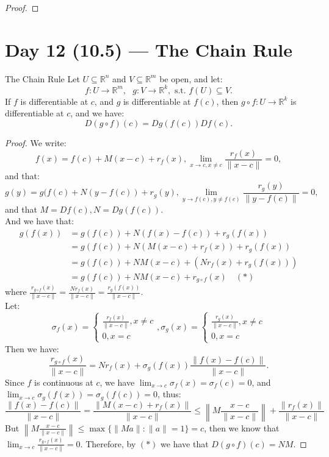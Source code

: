 \documentclass[11pt]{article}
\newenvironment{theorem}[1]{\begin{thmbox}{#1}{}}{\end{thmbox}}
\theoremstyle{quiet}
\theoremstyle{quietremark}
\begin{document}
\begin{proof}

\end{proof}


\newpage
\section{Day 12 (10.5) --- The Chain Rule}
\begin{theorem}{The Chain Rule}
Let $U\subseteq\mathbb{R}^n$ and $V\subseteq\mathbb{R}^m$ be open, and let:
\[
f:U\to\mathbb{R}^m, \text{ }g:V\to\mathbb{R}^k, \text{ s.t. } f(U)\subseteq V.
\]
If $f$ is differentiable at $c$, and $g$ is differentiable at $f(c)$, then $g\circ f:U\to\mathbb{R}^k$ is differentiable at $c$, and we have:
\[
D(g\circ f)(c)=Dg(f(c))Df(c).
\]
\end{theorem}

\begin{proof}
We write:
\[
f(x)=f(c)+M(x-c)+r_f(x), \lim_{x\to c,x\ne c}\frac{r_f(x)}{\|x-c\|}=0,
\]
and that:
\[
g(y)=g(f(c)+N(y-f(c))+r_g(y), \lim_{y\to f(c),y\ne f(c)}\frac{r_g(y)}{\|y-f(c)\|}=0, 
\]
and that $M=Df(c), N=Dg(f(c))$.\\
And we have that:
\[
\begin{aligned}
g(f(x)) &= g(f(c)) + N(f(x)-f(c)) + r_g(f(x)) \\
&= g(f(c)) + N(M(x-c)+r_f(x)) + r_g(f(x)) \\
&= g(f(c)) + NM(x-c) + (Nr_f(x)+r_g(f(x))) \\
&= g(f(c)) + NM(x-c) + r_{g\circ f}(x) \quad (*)
\end{aligned}
\]
where $\displaystyle\frac{r_{g\circ f}(x)}{\|x-c\|}=\frac{Nr_f(x)}{\|x-c\|}=\frac{r_g(f(x))}{\|x-c\|}$.
\\Let:
\[
\sigma_f(x)=\begin{cases}\frac{r_f(x)}{\|x-c\|},x\ne c\\0,x=c\end{cases}, \sigma_g(x)=\begin{cases}\frac{r_g(x)}{\|x-c\|},x\ne c\\0,x=c\end{cases}
\]
Then we have:
\[
\frac{r_{g\circ f}(x)}{\|x-c\|}=Nr_f(x)+\sigma_g(f(x))\frac{\|f(x)-f(c)\|}{\|x-c\|}.
\]
Since $f$ is continuous at $c$, we have $\displaystyle\lim_{x\to c}\sigma_f(x)=\sigma_f(c)=0$, and $\displaystyle\lim_{x\to c}\sigma_g(f(x))=\sigma_g(f(c))=0$, thus:
\[
\frac{\|f(x)-f(c)\|}{\|x-c\|}=\frac{\|M(x-c)+r_f(x)\|}{\|x-c\|}\le \left\|M\frac{x-c}{\|x-c\|}\right
\|+\frac{\|r_f(x)\|}{\|x-c\|}
\]
But $\left\|M\frac{x-c}{\|x-c\|}\right\|\le\max\{\|Ma\|:\|a\|=1\}=c$, then we know that $\displaystyle\lim_{x\to c}\frac{r_{g\circ f}(x)}{\|x-c\|}=0$.
Therefore, by $(*)$ we have that $D(g\circ f)(c)=NM.$
\end{proof}
\end{document}
